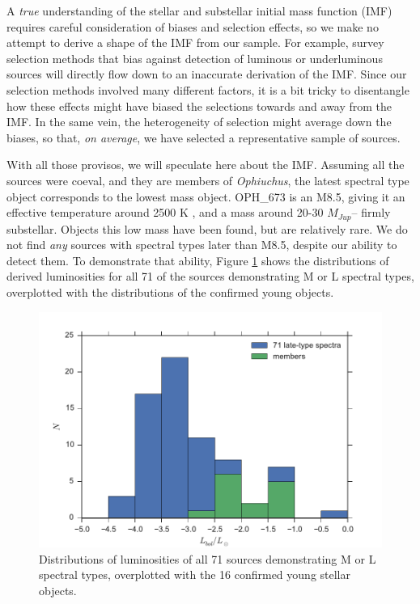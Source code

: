 \documentclass[12pt,preprint]{aastex}
\begin{document}
A \emph{true} understanding of the stellar and substellar initial mass function (IMF) requires careful consideration of biases and selection effects, so we make no attempt to derive a shape of the IMF from our sample.  For example, survey selection methods that bias against detection of luminous or underluminous sources will directly flow down to an inaccurate derivation of the IMF.  Since our selection methods involved many different factors, it is a bit tricky to disentangle how these effects might have biased the selections towards and away from the IMF.  In the same vein, the heterogeneity of selection might average down the biases, so that, \emph{on average}, we have selected a representative sample of sources.

With all those provisos, we will speculate here about the IMF.  Assuming all the sources were coeval, and they are members of \emph{Ophiuchus}, the latest spectral type object corresponds to the lowest mass object.  OPH\_673 is an M8.5, giving it an effective temperature around 2500 K \citep{2003ApJ...593.1093L}, and a mass around 20-30 $M_{Jup}$-- firmly substellar.  Objects this low mass have been found, but are relatively rare.  We do not find \emph{any} sources with spectral types later than M8.5, despite our ability to detect them.  To demonstrate that ability, Figure \ref{fig_luminosity_dist} shows the distributions of derived luminosities for all 71 of the sources demonstrating M or L spectral types, overplotted with the distributions of the confirmed young objects.

\begin{figure}[ht!]
  \caption{ Distributions of luminosities of all 71 sources demonstrating M or L spectral types, overplotted with the 16 confirmed young stellar objects. \label{fig_luminosity_dist} }
\centering
\includegraphics[scale=0.6]{figures/luminosity_histogram}
\end{figure}
\end{document}
